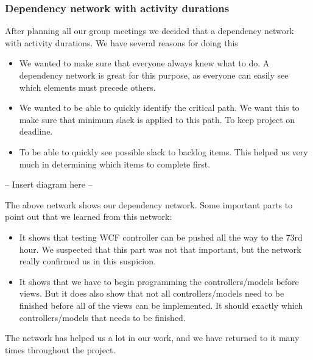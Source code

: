 \subsubsection{Dependency network with activity durations}
After planning all our group meetings we decided that a dependency network with activity durations. We have several reasons for doing this
\begin{itemize}
	\item We wanted to make sure that everyone always knew what to do. A dependency network is great for this purpose, as everyone can easily see which elements must precede others.
	\item We wanted to be able to quickly identify the critical path. We want this to make sure that minimum slack is applied to this path. To keep project on deadline.
	\item To be able to quickly see possible slack to backlog items. This helped us very much in determining which items to complete first.
\end{itemize}

-- Insert diagram here --

The above network shows our dependency network.
Some important parts to point out that we learned from this network:
\begin{itemize}
	\item It shows that testing WCF controller can be pushed all the way to the 73rd hour. We suspected that this part was not that important, but the network really confirmed us in this suspicion.
	\item It shows that we have to begin programming the controllers/models before views. But it does also show that not all controllers/models need to be finished before all of the views can be implemented. It should exactly which controllers/models that needs to be finished.
\end{itemize}

The network has helped us a lot in our work, and we have returned to it many times throughout the project.